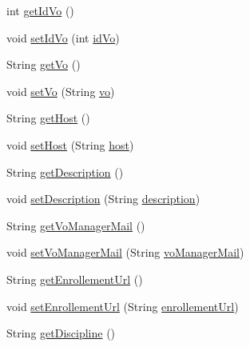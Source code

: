 \begin{DoxyCompactItemize}
\item 
int \hyperlink{classportal_1_1registration_1_1domain_1_1Vo_a59af74dbc7ed8e2d030851b21fa7f173}{getIdVo} ()
\item 
void \hyperlink{classportal_1_1registration_1_1domain_1_1Vo_a331fe23d8e69721b7a32dce6b8fbd7f2}{setIdVo} (int \hyperlink{classportal_1_1registration_1_1domain_1_1Vo_ad30081c762c1013c30f53f07a88aaf6c}{idVo})
\item 
String \hyperlink{classportal_1_1registration_1_1domain_1_1Vo_aab3c44f5df69949be59c33cfa557a1ad}{getVo} ()
\item 
void \hyperlink{classportal_1_1registration_1_1domain_1_1Vo_af2c90986839881772f5d09f53edd7dc6}{setVo} (String \hyperlink{classportal_1_1registration_1_1domain_1_1Vo_a1c5498821ecbdd3d80d5dce3f26a907e}{vo})
\item 
String \hyperlink{classportal_1_1registration_1_1domain_1_1Vo_ad730aeefc109dcbf2cccb8674cdd77ab}{getHost} ()
\item 
void \hyperlink{classportal_1_1registration_1_1domain_1_1Vo_acea5ffe8365a25c261e5beecfe4ccffb}{setHost} (String \hyperlink{classportal_1_1registration_1_1domain_1_1Vo_a39734694dfee646e14aa1a49cb06e5a0}{host})
\item 
String \hyperlink{classportal_1_1registration_1_1domain_1_1Vo_a88f03df452c43b0d9e538dbcbd538018}{getDescription} ()
\item 
void \hyperlink{classportal_1_1registration_1_1domain_1_1Vo_ae3775f46b97127a41d5d9958b70db9f7}{setDescription} (String \hyperlink{classportal_1_1registration_1_1domain_1_1Vo_ae59559dc7f4ebe9ba0fe8657774d6ddf}{description})
\item 
String \hyperlink{classportal_1_1registration_1_1domain_1_1Vo_aaa62147b8faef3b90195e80125724274}{getVoManagerMail} ()
\item 
void \hyperlink{classportal_1_1registration_1_1domain_1_1Vo_a1ad89c4e803c6013e25836524e3b71e7}{setVoManagerMail} (String \hyperlink{classportal_1_1registration_1_1domain_1_1Vo_a40f905eb8ab449d765fd1bcb7488a876}{voManagerMail})
\item 
String \hyperlink{classportal_1_1registration_1_1domain_1_1Vo_acd80da9609968810c876e018556bf955}{getEnrollementUrl} ()
\item 
void \hyperlink{classportal_1_1registration_1_1domain_1_1Vo_a3f7052f625906792f5338a643bd8c81b}{setEnrollementUrl} (String \hyperlink{classportal_1_1registration_1_1domain_1_1Vo_ad9cd8c77be188df99d145d515c7249c7}{enrollementUrl})
\item 
String \hyperlink{classportal_1_1registration_1_1domain_1_1Vo_aac28bf39af54eccf2c97f911c02ef328}{getDiscipline} ()

\end{DoxyCompactItemize}
